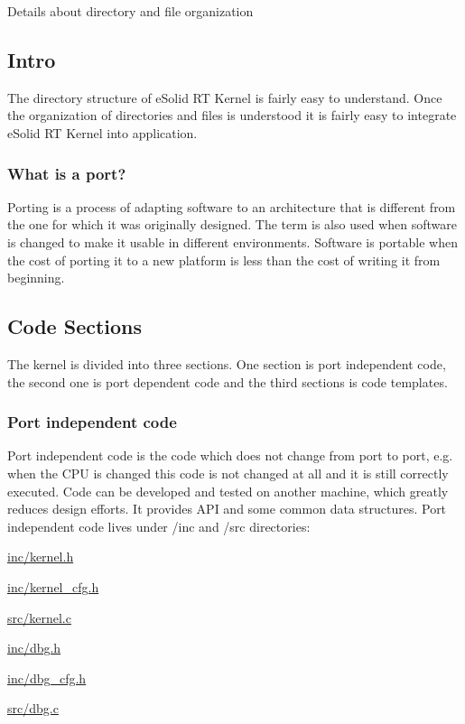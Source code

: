 Details about directory and file organization

\par
\par
\par
\hypertarget{files_org_files_intro}{}\subsection{Intro}\label{files_org_files_intro}
The directory structure of e\-Solid R\-T Kernel is fairly easy to understand. Once the organization of directories and files is understood it is fairly easy to integrate e\-Solid R\-T Kernel into application.\hypertarget{files_org_files_porting}{}\subsubsection{What is a port?}\label{files_org_files_porting}
Porting is a process of adapting software to an architecture that is different from the one for which it was originally designed. The term is also used when software is changed to make it usable in different environments. Software is portable when the cost of porting it to a new platform is less than the cost of writing it from beginning.\hypertarget{files_org_files_sections}{}\subsection{Code Sections}\label{files_org_files_sections}
The kernel is divided into three sections. One section is port independent code, the second one is port dependent code and the third sections is code templates.\hypertarget{files_org_files_icode}{}\subsubsection{Port independent code}\label{files_org_files_icode}
Port independent code is the code which does not change from port to port, e.\-g. when the C\-P\-U is changed this code is not changed at all and it is still correctly executed. Code can be developed and tested on another machine, which greatly reduces design efforts. It provides A\-P\-I and some common data structures. Port independent code lives under {\ttfamily /inc} and {\ttfamily /src} directories\-:
\begin{DoxyItemize}
\item {\ttfamily \hyperlink{kernel_8h}{inc/kernel.\-h}}
\item {\ttfamily \hyperlink{inc_2kernel__cfg_8h}{inc/kernel\-\_\-cfg.\-h}}
\item {\ttfamily \hyperlink{kernel_8c}{src/kernel.\-c}}
\item {\ttfamily \hyperlink{dbg_8h}{inc/dbg.\-h}}
\item {\ttfamily \hyperlink{inc_2dbg__cfg_8h}{inc/dbg\-\_\-cfg.\-h}}
\item {\ttfamily \hyperlink{dbg_8c}{src/dbg.\-c}}
\end{DoxyItemize}

